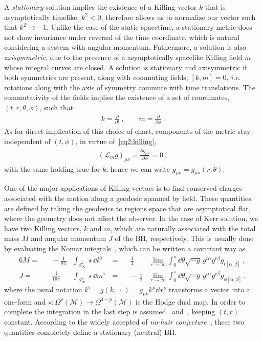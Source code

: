 A \emph{stationary} solution implies the existence of a Killing vector $k$ that is asymptotically timelike, $k^2<0$, therefore allows us to normalize our vector such that $k^2 \rightarrow -1$. 
Unlike the case of the static spacetime, a stationary metric does not show invariance under reversal of the time coordinate, which is natural considering a system with angular momentum. 
Futhermore, a solution is also \emph{axisymmetric}, due to the presence of a asymptotically spacelike Killing field $m$ whose integral curves are closed.
A solution is stationary and axisymmetric if both symmetries are present, along with commuting fields, $[k , m] = 0$, \emph{i.e.} rotations along with the axis of symmetry commute with time translations. The commutativity of the fields implies the existence of a set of coordinates, $(t,r,\theta,\phi)$, such that
\begin{align}
    k = \frac{\partial}{\partial t} ~, \qquad m = \frac{\partial}{\partial \phi} ~.
    \label{eq2:tPhiKilling}
\end{align}
As for direct implication of this choice of chart, components of the metric stay independent of $(t,\phi)$, in virtue of~\eqref{eq2:killing},
\begin{align}
    (\mathcal{L}_m g)_{\mu\nu} = \frac{\partial g_{\mu\nu}}{\partial \phi} = 0 ~,
    \label{eq2:lieMetricTPhi}
\end{align}
with the same holding true for $k$, hence we can write $g_{\mu\nu} = g_{\mu\nu}(r,\theta)$. 

One of the major applications of Killing vectors is to find conserved charges associated with the motion along a geodesic spanned by field.
These quantities are defined by taking the geodesics to regions space that are asymptotical flat, where the geometry does not affect the observer.
In the case of Kerr solution, we have two Killing vectors, $k$ and $m$, which are naturally associated with the total mass $M$ and angular momentum $J$ of the BH, respectively.
This is usually done by evaluating the Komar integrals~\cite{Heusler1996, Wald2010}, which can be written a covariant way as
\begin{alignat}{6}
    M = &&\, -\frac{1}{8 \pi} & \int_{S^2_\infty} \star \dd k^\flat \,& = &&\, \frac{1}{4} & \lim_{r\to\infty}  \int_0^\pi \dd\theta \sqrt{-g} \, g^{t\alpha} g^{r\beta} g_{t[\alpha,\beta]} ~, \label{eq2:komarMass} \\
    J = &&\, \frac{1}{16 \pi} & \int_{S^2_\infty} \star \dd m^\flat \,& = &&\, - \frac{1}{8} & \lim_{r\to\infty}  \int_0^\pi \dd\theta \sqrt{-g} \, g^{t\alpha} g^{r\beta} g_{\phi[\alpha,\beta]} ~, \label{eq2:komarSpin}
\end{alignat}
where the usual notation $k^\flat = g(k, \,\cdot\,) = g_{\mu\nu} k^\mu \dd x^\nu$ transforms a vector into a one-form and $\star : \Omega^{p}(\mathcal{M})\to\Omega^{4-p}(\mathcal{M})$ is the Hodge dual map.
In order to complete the integration in the last step is assumed~ and~, keeping $(t,r)$ constant. 
According to the widely accepted of \emph{no-hair conjecture}~\cite{Carter1971}, these two quantities completely define a stationary (neutral) BH. 


